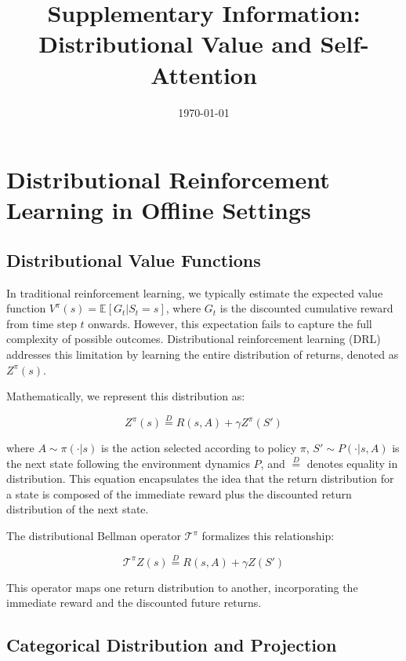 \documentclass[12pt]{article}
\begin{document}
\title{Supplementary Information: Distributional Value and Self-Attention}
\date{\today}
\maketitle

\section{Distributional Reinforcement Learning in Offline Settings}

\subsection{Distributional Value Functions}

In traditional reinforcement learning, we typically estimate the expected value function $V^\pi(s) = \mathbb{E}[G_t | S_t = s]$, where $G_t$ is the discounted cumulative reward from time step $t$ onwards. However, this expectation fails to capture the full complexity of possible outcomes. Distributional reinforcement learning (DRL) addresses this limitation by learning the entire distribution of returns, denoted as $Z^\pi(s)$.

Mathematically, we represent this distribution as:

\begin{equation}
Z^\pi(s) \stackrel{D}{=} R(s, A) + \gamma Z^\pi(S')
\end{equation}

where $A \sim \pi(\cdot|s)$ is the action selected according to policy $\pi$, $S' \sim P(\cdot|s,A)$ is the next state following the environment dynamics $P$, and $\stackrel{D}{=}$ denotes equality in distribution. This equation encapsulates the idea that the return distribution for a state is composed of the immediate reward plus the discounted return distribution of the next state.

The distributional Bellman operator $\mathcal{T}^\pi$ formalizes this relationship:

\begin{equation}
\mathcal{T}^\pi Z(s) \stackrel{D}{=} R(s, A) + \gamma Z(S')
\end{equation}

This operator maps one return distribution to another, incorporating the immediate reward and the discounted future returns.

\subsection{Categorical Distribution and Projection}
\end{document}

